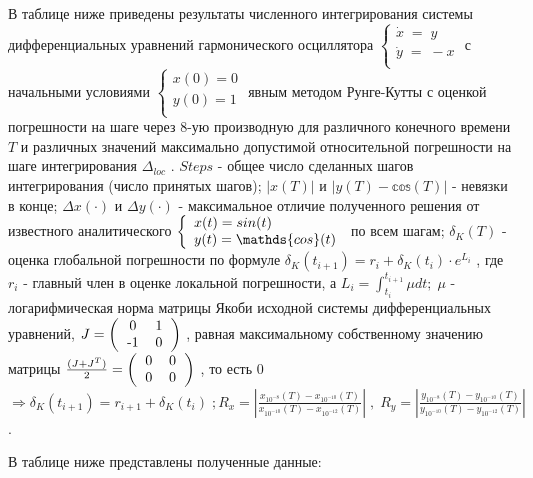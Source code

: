 \documentclass[a4paper,12pt]{article}
\begin{document}
В таблице ниже приведены результаты численного интегрирования системы дифференциальных уравнений гармонического осциллятора $
\left\{
\begin{array}{l}
    \dot x\;=\; y\\
    \dot y\;=\; -x\\
\end{array}
\right.
$  с начальными условиями  $
\left\{
\begin{array}{l}
    x(0)=0\\
    y(0)=1\\
\end{array}
\right.
$ явным методом Рунге-Кутты с оценкой погрешности на шаге через 8-ую производную для различного конечного времени $T$ и различных значений максимально допустимой относительной погрешности на шаге интегрирования $\Delta_{loc}$ . $Steps$ - общее число сделанных шагов интегрирования (число принятых шагов); $|x(T)|$ и $|y(T)-\mathds{cos}(T)|$ - невязки в конце;  $\Delta x(\cdot)$ и $\Delta y(\cdot)$ - максимальное отличие полученного решения от известного аналитического $
\left\{
\begin{array}{l}
    x(t)=\mathnormal{sin}(t)\\
    y(t)=\mathds{cos}(t)
\end{array}
\right.
$  по всем шагам;  $\delta_K(T)$ - оценка глобальной погрешности по формуле $\delta_K(t_{i+1})=r_i+\delta_K(t_i)\cdot e^{L_i}$ , где $r_i$ -  главный член в оценке локальной погрешности, а $L_i=\int_{t_i}^{t_{i+1}} \mu dt; \;\mu $ - логарифмическая норма матрицы Якоби исходной системы дифференциальных уравнений, $
J=
\left(
\begin{tabular}{cc}
    0&1\\
    -1&0\\
\end{tabular}
\right)
$ , равная максимальному собственному  значению матрицы $\frac{(J+J^T)}{2}=
\left(
\begin{tabular}{cc}
    0&0\\
    0&0\\
\end{tabular}
\right)
$ , то есть 0 $\Rightarrow \delta_K(t_{i+1})= r_{i+1} +\delta_K(t_i)\; ;
R_x = \left|\frac{x_{10^{-8}}(T)-x_{10^{-10}}(T)}{x_{10^{-10}}(T)-x_{10^{-12}}(T)}\right| \; , \; R_y= \left|\frac{y_{10^{-8}}(T)-y_{10^{-10}}(T)}{y_{10^{-10}}(T)-y_{10^{-12}}(T)}\right|$ .
 
В таблице ниже представлены полученные данные:
\end{document}
